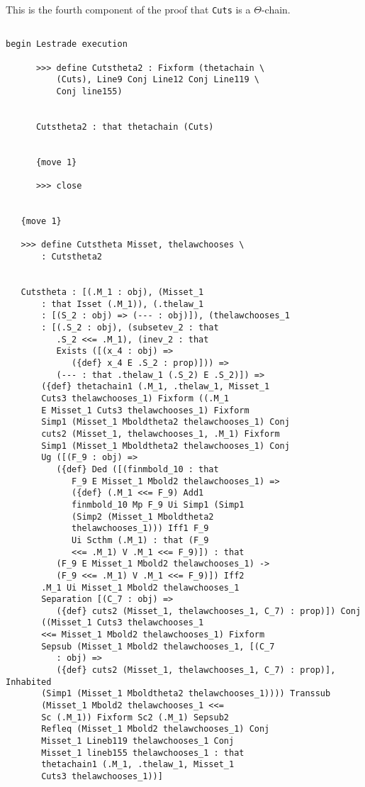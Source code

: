 \documentclass[12pt]{article}
\begin{document}
This is the fourth component of the proof that {\tt Cuts} is a $\Theta$-chain.

\begin{verbatim}

begin Lestrade execution

      >>> define Cutstheta2 : Fixform (thetachain \
          (Cuts), Line9 Conj Line12 Conj Line119 \
          Conj line155)


      Cutstheta2 : that thetachain (Cuts)


      {move 1}

      >>> close


   {move 1}

   >>> define Cutstheta Misset, thelawchooses \
       : Cutstheta2


   Cutstheta : [(.M_1 : obj), (Misset_1 
       : that Isset (.M_1)), (.thelaw_1 
       : [(S_2 : obj) => (--- : obj)]), (thelawchooses_1 
       : [(.S_2 : obj), (subsetev_2 : that 
          .S_2 <<= .M_1), (inev_2 : that 
          Exists ([(x_4 : obj) => 
             ({def} x_4 E .S_2 : prop)])) => 
          (--- : that .thelaw_1 (.S_2) E .S_2)]) => 
       ({def} thetachain1 (.M_1, .thelaw_1, Misset_1 
       Cuts3 thelawchooses_1) Fixform ((.M_1 
       E Misset_1 Cuts3 thelawchooses_1) Fixform 
       Simp1 (Misset_1 Mboldtheta2 thelawchooses_1) Conj 
       cuts2 (Misset_1, thelawchooses_1, .M_1) Fixform 
       Simp1 (Misset_1 Mboldtheta2 thelawchooses_1) Conj 
       Ug ([(F_9 : obj) => 
          ({def} Ded ([(finmbold_10 : that 
             F_9 E Misset_1 Mbold2 thelawchooses_1) => 
             ({def} (.M_1 <<= F_9) Add1 
             finmbold_10 Mp F_9 Ui Simp1 (Simp1 
             (Simp2 (Misset_1 Mboldtheta2 
             thelawchooses_1))) Iff1 F_9 
             Ui Scthm (.M_1) : that (F_9 
             <<= .M_1) V .M_1 <<= F_9)]) : that 
          (F_9 E Misset_1 Mbold2 thelawchooses_1) -> 
          (F_9 <<= .M_1) V .M_1 <<= F_9)]) Iff2 
       .M_1 Ui Misset_1 Mbold2 thelawchooses_1 
       Separation [(C_7 : obj) => 
          ({def} cuts2 (Misset_1, thelawchooses_1, C_7) : prop)]) Conj 
       ((Misset_1 Cuts3 thelawchooses_1 
       <<= Misset_1 Mbold2 thelawchooses_1) Fixform 
       Sepsub (Misset_1 Mbold2 thelawchooses_1, [(C_7 
          : obj) => 
          ({def} cuts2 (Misset_1, thelawchooses_1, C_7) : prop)], Inhabited 
       (Simp1 (Misset_1 Mboldtheta2 thelawchooses_1)))) Transsub 
       (Misset_1 Mbold2 thelawchooses_1 <<= 
       Sc (.M_1)) Fixform Sc2 (.M_1) Sepsub2 
       Refleq (Misset_1 Mbold2 thelawchooses_1) Conj 
       Misset_1 Lineb119 thelawchooses_1 Conj 
       Misset_1 lineb155 thelawchooses_1 : that 
       thetachain1 (.M_1, .thelaw_1, Misset_1 
       Cuts3 thelawchooses_1))]



\end{verbatim}
\end{document}
